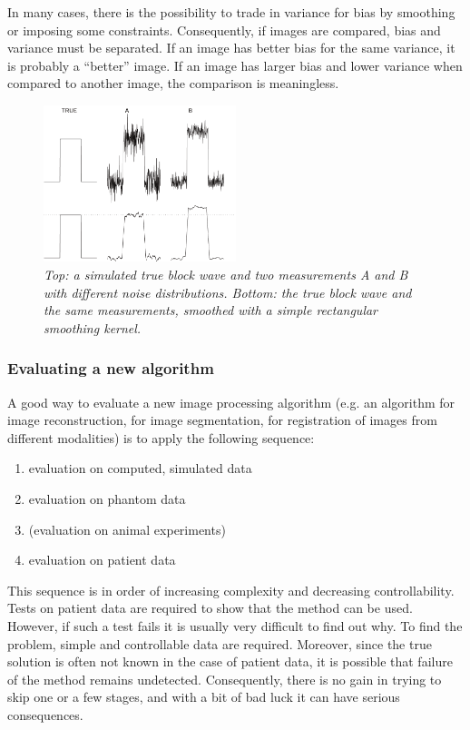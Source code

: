 \documentclass[11pt,oneside]{article}
\begin{document}
In many cases, there is the possibility to trade in variance for bias by
smoothing or imposing some constraints. Consequently, if images are compared,
bias and variance must be separated. If an image has better bias for the same
variance, it is probably a ``better'' image. If an image has larger bias and
lower variance when compared to another image, the comparison is meaningless.

\begin{figure}[tb]
\centering
\includegraphics[width=0.5\textwidth]{figs/fig_bias_var.pdf}
\caption{\label{fig:bias_var} \emph{Top: a simulated true block wave and two
measurements A and B with different noise distributions. Bottom: the true
block wave and the same measurements, smoothed with a simple rectangular
smoothing kernel.}}
\end{figure}

\subsubsection{Evaluating a new algorithm}
A good way to evaluate a new image processing algorithm (e.g. an algorithm for
image reconstruction, for image segmentation, for registration of images from
different modalities) is to apply the following sequence:
\begin{enumerate}
  \item evaluation on computed, simulated data
  \item evaluation on phantom data
  \item (evaluation on animal experiments)
  \item evaluation on patient data
\end{enumerate}
This sequence is in order of increasing complexity and decreasing
controllability. Tests on patient data are required to show that the method
can be used. However, if such a test fails it is usually very difficult to
find out why. To find the problem, simple and controllable data are required.
Moreover, since the true solution is often not known in the case of patient
data, it is possible that failure of the method remains undetected.
Consequently, there is no gain in trying to skip one or a few stages, and with
a bit of bad luck it can have serious consequences.
\end{document}
